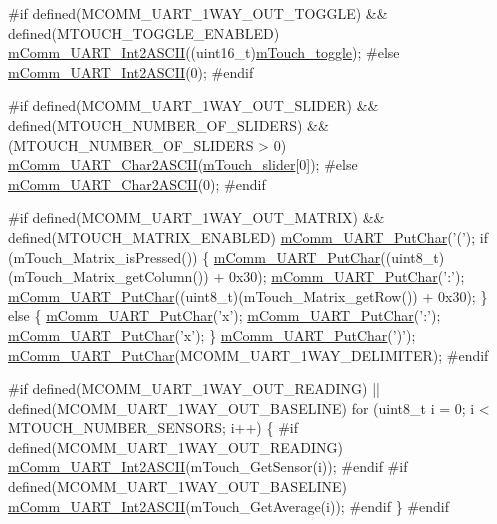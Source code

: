 \begin{DoxyEnumerate}
\begin{DoxyCode}
\textcolor{preprocessor}{    #if defined(MCOMM\_UART\_1WAY\_OUT\_TOGGLE) && defined(MTOUCH\_TOGGLE\_ENABLED)}
    \hyperlink{m_comm_8c_af25da52c9da7c8fa9337c43ad5d7a1b6}{mComm\_UART\_Int2ASCII}((uint16\_t)\hyperlink{m_touch_8c_a827719a95ea3e7c38efa02c8e1188015}{mTouch\_toggle});
\textcolor{preprocessor}{    #else}
    \hyperlink{m_comm_8c_af25da52c9da7c8fa9337c43ad5d7a1b6}{mComm\_UART\_Int2ASCII}(0);
\textcolor{preprocessor}{    #endif}
    
\textcolor{preprocessor}{    #if defined(MCOMM\_UART\_1WAY\_OUT\_SLIDER) && defined(MTOUCH\_NUMBER\_OF\_SLIDERS) &&
       (MTOUCH\_NUMBER\_OF\_SLIDERS > 0)}
    \hyperlink{m_comm_8c_a239a6ceb1aeca100de01f2522fb3ca2c}{mComm\_UART\_Char2ASCII}(\hyperlink{m_touch_cap_2_p_i_c12_f_01_p_i_c16_f_01_library_2m_touch_8h_a8d74be95f98e1d233f912708ef99d445}{mTouch\_slider}[0]);            
\textcolor{preprocessor}{    #else}
    \hyperlink{m_comm_8c_a239a6ceb1aeca100de01f2522fb3ca2c}{mComm\_UART\_Char2ASCII}(0);
\textcolor{preprocessor}{    #endif}

\textcolor{preprocessor}{    #if defined(MCOMM\_UART\_1WAY\_OUT\_MATRIX) && defined(MTOUCH\_MATRIX\_ENABLED)}
    \hyperlink{m_comm_8c_a52e190faf8c2c0afe082c6ab232da4c8}{mComm\_UART\_PutChar}(\textcolor{charliteral}{'('});
    \textcolor{keywordflow}{if} (mTouch\_Matrix\_isPressed())
    \{
        \hyperlink{m_comm_8c_a52e190faf8c2c0afe082c6ab232da4c8}{mComm\_UART\_PutChar}((uint8\_t)(mTouch\_Matrix\_getColumn()) + 0x30);
        \hyperlink{m_comm_8c_a52e190faf8c2c0afe082c6ab232da4c8}{mComm\_UART\_PutChar}(\textcolor{charliteral}{':'});
        \hyperlink{m_comm_8c_a52e190faf8c2c0afe082c6ab232da4c8}{mComm\_UART\_PutChar}((uint8\_t)(mTouch\_Matrix\_getRow())    + 0x30);
    \}
    \textcolor{keywordflow}{else}
    \{
        \hyperlink{m_comm_8c_a52e190faf8c2c0afe082c6ab232da4c8}{mComm\_UART\_PutChar}(\textcolor{charliteral}{'x'});
        \hyperlink{m_comm_8c_a52e190faf8c2c0afe082c6ab232da4c8}{mComm\_UART\_PutChar}(\textcolor{charliteral}{':'});
        \hyperlink{m_comm_8c_a52e190faf8c2c0afe082c6ab232da4c8}{mComm\_UART\_PutChar}(\textcolor{charliteral}{'x'});
    \}
    \hyperlink{m_comm_8c_a52e190faf8c2c0afe082c6ab232da4c8}{mComm\_UART\_PutChar}(\textcolor{charliteral}{')'});
    \hyperlink{m_comm_8c_a52e190faf8c2c0afe082c6ab232da4c8}{mComm\_UART\_PutChar}(MCOMM\_UART\_1WAY\_DELIMITER);
\textcolor{preprocessor}{    #endif}
    
\textcolor{preprocessor}{    #if defined(MCOMM\_UART\_1WAY\_OUT\_READING) || defined(MCOMM\_UART\_1WAY\_OUT\_BASELINE)}
    \textcolor{keywordflow}{for} (uint8\_t i = 0; i < MTOUCH\_NUMBER\_SENSORS; i++)
    \{
\textcolor{preprocessor}{        #if defined(MCOMM\_UART\_1WAY\_OUT\_READING)}
        \hyperlink{m_comm_8c_af25da52c9da7c8fa9337c43ad5d7a1b6}{mComm\_UART\_Int2ASCII}(mTouch\_GetSensor(i));      
\textcolor{preprocessor}{        #endif                                          }
\textcolor{preprocessor}{        #if defined(MCOMM\_UART\_1WAY\_OUT\_BASELINE)}
        \hyperlink{m_comm_8c_af25da52c9da7c8fa9337c43ad5d7a1b6}{mComm\_UART\_Int2ASCII}(mTouch\_GetAverage(i));     
\textcolor{preprocessor}{        #endif}
    \}
\textcolor{preprocessor}{    #endif}
    

\end{DoxyCode}
\end{DoxyEnumerate}
